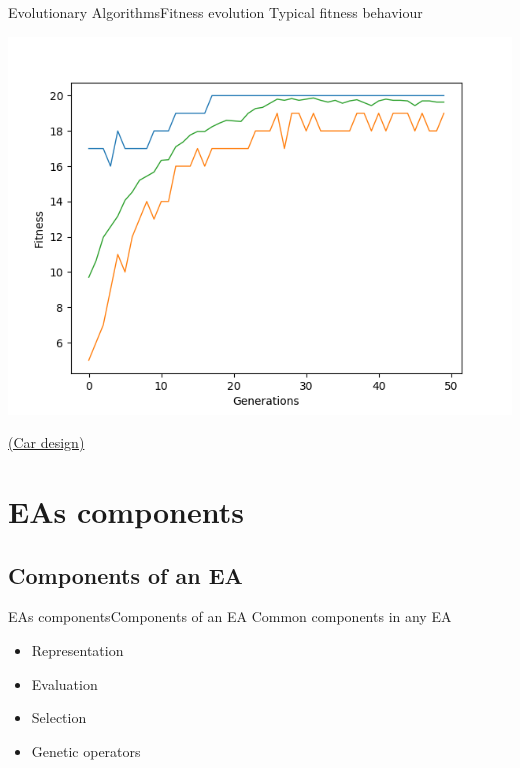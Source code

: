\documentclass[10pt,compress]{beamer} %
\begin{document}
\begin{frame}{Evolutionary Algorithms}{Fitness evolution} 
	Typical fitness behaviour
    \vspace{-0.3cm}
	\begin{center}
	\includegraphics[width=0.7\linewidth]{figs/fitness.png}\\
	\end{center}

    \vspace{-0.3cm}
	\href{http://rednuht.org/genetic\_cars\_2/} {(Car design)}
\end{frame}


\section{EAs components}
\subsection{Components of an EA}
\begin{frame}{EAs components}{Components of an EA}
	Common components in any EA
	\begin{itemize}
		\item Representation
		\item Evaluation
		\item Selection
		\item Genetic operators
	\end{itemize}
\end{frame}
\end{document}
